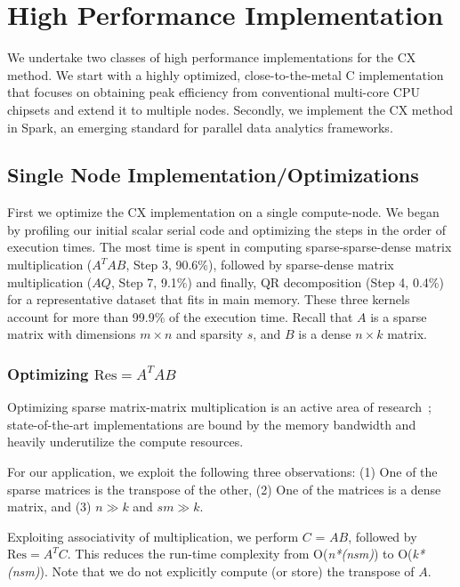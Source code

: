 
\section{High Performance Implementation}
\label{sec:implementation}

We undertake two classes of high performance implementations for the CX method. 
We start with a highly optimized, close-to-the-metal C implementation
that focuses on obtaining peak efficiency from conventional multi-core
CPU chipsets and extend it to multiple nodes. 
Secondly, we implement the CX method in Spark, an emerging standard for parallel data analytics frameworks. 

\subsection {Single Node Implementation/Optimizations}
\label{sxn:single_node_opt}

First we optimize the CX implementation on a single compute-node.  We
began by profiling our initial scalar serial code and 
optimizing the steps in the order of execution times.  The most time is spent
in computing sparse-sparse-dense matrix multiplication ($A^TAB$, Step 3,
90.6\%), followed by  sparse-dense matrix multiplication ($AQ$, Step 7, 9.1\%)
and finally, QR decomposition (Step 4, 0.4\%) for a representative dataset that
fits in main memory. These three kernels account for more than 99.9\% of the
execution time.  Recall that $A$ is a sparse matrix with dimensions $m \times
n$ and sparsity $s$, and $B$ is a dense $n \times k$ matrix.

\vspace*{0.05in} 
\subsubsection{Optimizing $\mathrm{Res}=A^TAB$}
Optimizing sparse matrix-matrix  multiplication is an
active area of research~\cite{ballard13,patwary15}; 
state-of-the-art implementations
are bound by the memory bandwidth and heavily
underutilize the compute resources. 

For our application, we exploit the following three observations:
(1) One of the sparse matrices is the transpose of the other,   
(2) One of the matrices is a dense matrix,   and    %
(3) $n \gg k$ and $sm \gg k$.

Exploiting associativity of multiplication, we perform $C$ = $AB$, 
followed by $\mathrm{Res} = A^TC$. This reduces the run-time complexity from
O({\it{n*(nsm)}}) to O({\it{k*(nsm)}}). Note that we do not
explicitly compute (or store) the transpose of $A$. 

